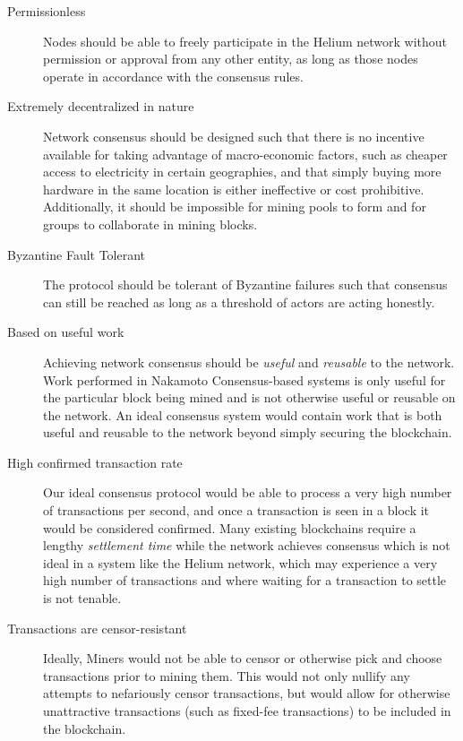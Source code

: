 \documentclass[10pt, nonatbib, nocopyrightspace, reprint]{sigplanconf}
\begin{document}
\begin{description}
\item [Permissionless] Nodes should be able to freely participate in the Helium network without permission or approval from any other entity, as long as those nodes operate in accordance with the consensus rules.

\item [Extremely decentralized in nature] Network consensus should be designed such that there is no incentive available for taking advantage of macro-economic factors, such as cheaper access to electricity in certain geographies, and that simply buying more hardware in the same location is either ineffective or cost prohibitive. Additionally, it should be impossible for mining pools to form and for groups to collaborate in mining blocks.

\item [Byzantine Fault Tolerant] The protocol should be tolerant of Byzantine failures \cite{byzantine-failures} such that consensus can still be reached as long as a threshold of actors are acting honestly.

\item [Based on useful work] Achieving network consensus should be \emph{useful} and \emph{reusable} to the network. Work performed in Nakamoto Consensus-based systems is only useful for the particular block being mined and is not otherwise useful or reusable on the network. An ideal consensus system would contain work that is both useful and reusable to the network beyond simply securing the blockchain.

\item [High confirmed transaction rate] Our ideal consensus protocol would be able to process a very high number of transactions per second, and once a transaction is seen in a block it would be considered confirmed. Many existing blockchains require a lengthy \emph{settlement time} while the network achieves consensus which is not ideal in a system like the Helium network, which may experience a very high number of transactions and where waiting for a transaction to settle is not tenable.

\item [Transactions are censor-resistant] Ideally, Miners would not be able to censor or otherwise pick and choose transactions prior to mining them. This would not only nullify any attempts to nefariously censor transactions, but would allow for otherwise unattractive transactions (such as fixed-fee transactions) to be included in the blockchain.

\end{description}
\end{document}
